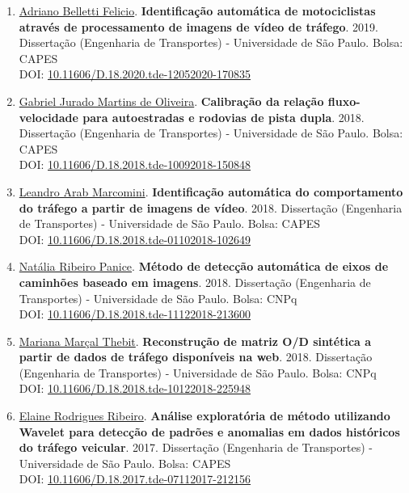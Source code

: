 \documentclass[
  brazilian,
  11pt,
  a4paper,
]{article}
\begin{document}
\begin{enumerate}
{  morfologias urbanas brasileiras}. 2019. Dissertação (Engenharia de
  Transportes) - Universidade de São Paulo. Bolsa: CNPq\\
  DOI:
  \href{https://doi.org/10.11606/D.18.2019.tde-20082019-084513}{10.11606/D.18.2019.tde-20082019-084513}
\item
  \href{https://lattes.cnpq.br/1581979506356539}{Adriano Belletti
  Felicio}. \textbf{Identificação automática de motociclistas através de
  processamento de imagens de vídeo de tráfego}. 2019. Dissertação
  (Engenharia de Transportes) - Universidade de São Paulo. Bolsa:
  CAPES\\
  DOI:
  \href{https://doi.org/10.11606/D.18.2020.tde-12052020-170835}{10.11606/D.18.2020.tde-12052020-170835}
\item
  \href{https://lattes.cnpq.br/1828432370828925}{Gabriel Jurado Martins
  de Oliveira}. \textbf{Calibração da relação fluxo-velocidade para
  autoestradas e rodovias de pista dupla}. 2018. Dissertação (Engenharia
  de Transportes) - Universidade de São Paulo. Bolsa: CAPES\\
  DOI:
  \href{https://doi.org/10.11606/D.18.2018.tde-10092018-150848}{10.11606/D.18.2018.tde-10092018-150848}
\item
  \href{https://lattes.cnpq.br/3128200022537201}{Leandro Arab
  Marcomini}. \textbf{Identificação automática do comportamento do
  tráfego a partir de imagens de vídeo}. 2018. Dissertação (Engenharia
  de Transportes) - Universidade de São Paulo. Bolsa: CAPES\\
  DOI:
  \href{https://doi.org/10.11606/D.18.2018.tde-01102018-102649}{10.11606/D.18.2018.tde-01102018-102649}
\item
  \href{https://lattes.cnpq.br/3462901770011968}{Natália Ribeiro
  Panice}. \textbf{Método de detecção automática de eixos de caminhões
  baseado em imagens}. 2018. Dissertação (Engenharia de Transportes) -
  Universidade de São Paulo. Bolsa: CNPq\\
  DOI:
  \href{https://doi.org/10.11606/D.18.2018.tde-11122018-213600}{10.11606/D.18.2018.tde-11122018-213600}
\item
  \href{https://lattes.cnpq.br/9374994847060943}{Mariana Marçal Thebit}.
  \textbf{Reconstrução de matriz O/D sintética a partir de dados de
  tráfego disponíveis na web}. 2018. Dissertação (Engenharia de
  Transportes) - Universidade de São Paulo. Bolsa: CNPq\\
  DOI:
  \href{https://doi.org/10.11606/D.18.2018.tde-10122018-225948}{10.11606/D.18.2018.tde-10122018-225948}
\item
  \href{https://lattes.cnpq.br/4988917064689096}{Elaine Rodrigues
  Ribeiro}. \textbf{Análise exploratória de método utilizando Wavelet
  para detecção de padrões e anomalias em dados históricos do tráfego
  veicular}. 2017. Dissertação (Engenharia de Transportes) -
  Universidade de São Paulo. Bolsa: CAPES\\
  DOI:
  \href{https://doi.org/10.11606/D.18.2017.tde-07112017-212156}{10.11606/D.18.2017.tde-07112017-212156}
\end{enumerate}
\end{document}
